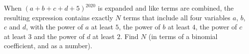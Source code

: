 When $(a+b+c+d+5)^{2020}$ is expanded and like terms are combined, the resulting expression contains exactly $N$ terms that include all four variables $a$, $b$, $c$ and $d$, with the power of $a$ at least $5$, the power of $b$ at least $4$, the power of $c$ at least $3$ and the power of $d$ at least $2$. Find $N$ (in terms of a binomial coefficient, and as a number).
